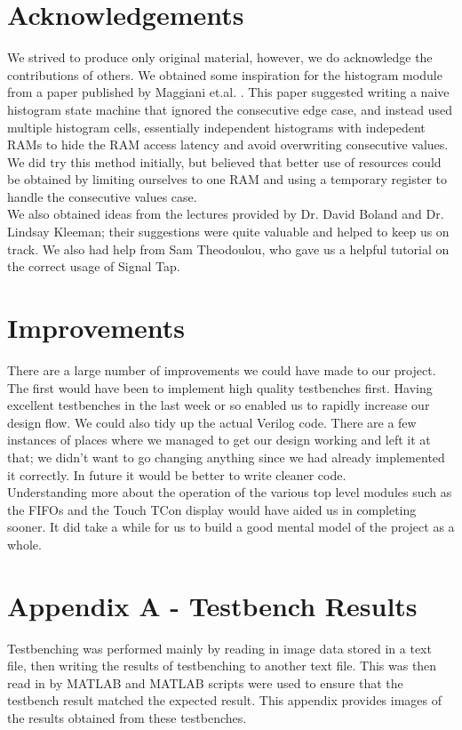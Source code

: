 \documentclass[12pt]{article}
\begin{document}
  \section{Acknowledgements}
  We strived to produce only original material, however, we do acknowledge the contributions of others. We obtained some inspiration for the histogram module from a paper published by Maggiani et.al. \cite{histogram}. This paper suggested writing a naive histogram state machine that ignored the consecutive edge case, and instead used multiple histogram cells, essentially independent histograms with indepedent RAMs to hide the RAM access latency and avoid overwriting consecutive values. We did try this method initially, but believed that better use of resources could be obtained by limiting ourselves to one RAM and using a temporary register to handle the consecutive values case. \\
  
  We also obtained ideas from the lectures provided by Dr. David Boland and Dr. Lindsay Kleeman; their suggestions were quite valuable and helped to keep us on track. We also had help from Sam Theodoulou, who gave us a helpful tutorial on the correct usage of Signal Tap.
  
  \section{Improvements}
  There are a large number of improvements we could have made to our project. The first would have been to implement high quality testbenches first. Having excellent testbenches in the last week or so enabled us to rapidly increase our design flow. We could also tidy up the actual Verilog code. There are a few instances of places where we managed to get our design working and left it at that; we didn't want to go changing anything since we had already implemented it correctly. In future it would be better to write cleaner code. \\
  
  Understanding more about the operation of the various top level modules such as the FIFOs and the Touch TCon display would have aided us in completing sooner. It did take a while for us to build a good mental model of the project as a whole.
  
  
  
  \newpage
  \section{Appendix A - Testbench Results}
  Testbenching was performed mainly by reading in image data stored in a text file, then writing the results of testbenching to another text file. This was then read in by MATLAB and MATLAB scripts were used to ensure that the testbench result matched the expected result. This appendix provides images of the results obtained from these testbenches.
\end{document}
